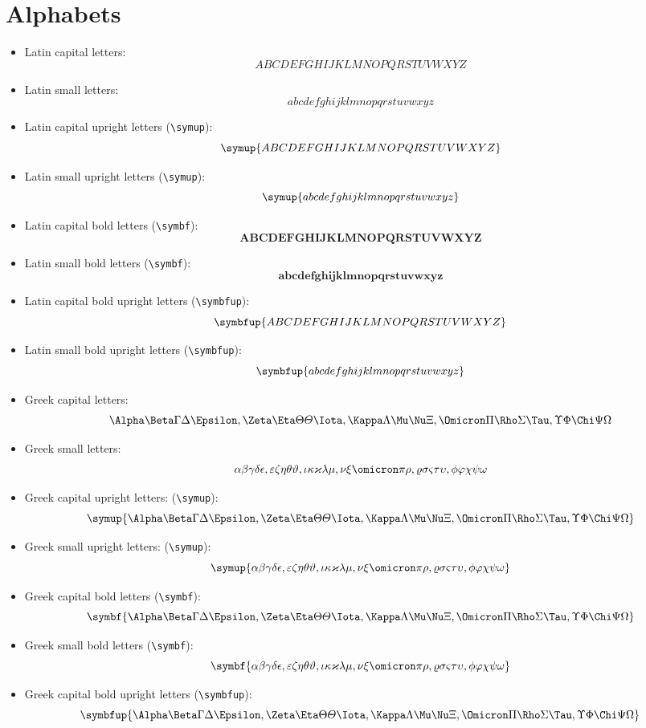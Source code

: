 \documentclass{article}
\def\Latinalphabets{ABCDEFGHIJKLMNOPQRSTUVWXYZ}
\def\latinalphabets{abcdefghijklmnopqrstuvwxyz}
\def\Greekalphabets{
  \Alpha      \Beta       \Gamma      \Delta      \Epsilon   ,
  \Zeta       \Eta        \Theta      \varTheta   \Iota      ,
  \Kappa      \Lambda     \Mu         \Nu         \Xi        ,
  \Omicron    \Pi         \Rho        \Sigma      \Tau       ,
  \Upsilon    \Phi        \Chi        \Psi        \Omega
}
\def\greekalphabets{
  \alpha      \beta       \gamma      \delta      \epsilon   ,
  \varepsilon \zeta       \eta        \theta      \vartheta  ,
  \iota       \kappa      \varkappa   \lambda     \mu        ,
  \nu         \xi         \omicron    \pi         \rho       ,
  \varrho     \sigma      \varsigma   \tau        \upsilon   ,
  \phi        \varphi     \chi        \psi        \omega
}
\begin{document}
\section{Alphabets}

\begin{itemize}
  \item Latin capital letters:
        \[ \Latinalphabets \]

  \item Latin small letters:
        \[ \latinalphabets \]

  \item Latin capital upright letters (\verb|\symup|):
        \[ \symup{\Latinalphabets} \]

  \item Latin small upright letters (\verb|\symup|):
        \[ \symup{\latinalphabets} \]

  \item Latin capital bold letters (\verb|\symbf|):
        \[ \symbf{\Latinalphabets} \]

  \item Latin small bold letters (\verb|\symbf|):
        \[ \symbf{\latinalphabets} \]

  \item Latin capital bold upright letters (\verb|\symbfup|):
        \[ \symbfup{\Latinalphabets} \]

  \item Latin small bold upright letters (\verb|\symbfup|):
        \[ \symbfup{\latinalphabets} \]

  \item Greek capital letters:
        \[ \Greekalphabets \]

  \item Greek small letters:
        \[ \greekalphabets \]

  \item Greek capital upright letters: (\verb|\symup|):
        \[ \symup{\Greekalphabets} \]

  \item Greek small upright letters: (\verb|\symup|):
        \[ \symup{\greekalphabets} \]

  \item Greek capital bold letters (\verb|\symbf|):
        \[ \symbf{\Greekalphabets} \]

  \item Greek small bold letters (\verb|\symbf|):
        \[ \symbf{\greekalphabets} \]

  \item Greek capital bold upright letters (\verb|\symbfup|):
        \[ \symbfup{\Greekalphabets} \]


\end{itemize}
\end{document}
